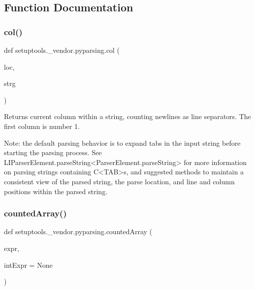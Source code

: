\subsection{Function Documentation}
\mbox{\label{namespacesetuptools_1_1__vendor_1_1pyparsing_a13f78917dedd3b24efd20f220ea25649}} 
\subsubsection{\texorpdfstring{col()}{col()}}
{\footnotesize\ttfamily def setuptools.\+\_\+vendor.\+pyparsing.\+col (\begin{DoxyParamCaption}\item[{}]{loc,  }\item[{}]{strg }\end{DoxyParamCaption})}

\begin{DoxyVerb}Returns current column within a string, counting newlines as line separators.
   The first column is number 1.

   Note: the default parsing behavior is to expand tabs in the input string
   before starting the parsing process.  See L{I{ParserElement.parseString}<ParserElement.parseString>} for more information
   on parsing strings containing C{<TAB>}s, and suggested methods to maintain a
   consistent view of the parsed string, the parse location, and line and column
   positions within the parsed string.\end{DoxyVerb}
 \mbox{\label{namespacesetuptools_1_1__vendor_1_1pyparsing_a67bb1324811cd2d127f551efcefa1333}} 
\subsubsection{\texorpdfstring{counted\+Array()}{countedArray()}}
{\footnotesize\ttfamily def setuptools.\+\_\+vendor.\+pyparsing.\+counted\+Array (\begin{DoxyParamCaption}\item[{}]{expr,  }\item[{}]{int\+Expr = {\ttfamily None} }\end{DoxyParamCaption})}

